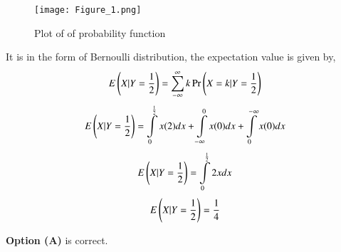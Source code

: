 \documentclass[journal,12pt,twocolumn]{IEEEtran}
\begin{document}
\begin{figure}[h!]
    \centering
    \texttt{[image: Figure\_1.png]}
    \caption{Plot of of probability function}
    \label{fig:plot}
\end{figure}

It is in the form of Bernoulli distribution, the expectation value is given by,
\begin{align}
    E\left(X|Y=\frac{1}{2}\right)=\sum\limits_{-\infty}^{\infty}k\Pr\left(X=k|Y=\frac{1}{2}\right)
\end{align}
\begin{align}
    E\left(X|Y=\frac{1}{2}\right)=\int\limits_0^\frac{1}{2}x(2)d x + \int\limits_{-\infty}^0x(0)d x + \int\limits^{-\infty}_0x(0)d x
\end{align}
\begin{align}
    E\left(X|Y=\frac{1}{2}\right)=\int\limits_0^\frac{1}{2}2x d x
\end{align}
\begin{align}
    E\left(X|Y=\frac{1}{2}\right)=\frac{1}{4}
\end{align}

\textbf{Option (A)} is correct.
\end{document}
